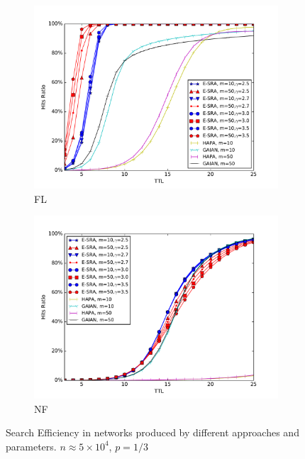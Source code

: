\begin{figure}[!t]
\centering

\begin{subfigure}{.45\textwidth} 
\centering
\includegraphics[width=.99\linewidth]{img/chap2/FL.pdf}
\caption{FL}\label{fig:removeFL}
\end{subfigure} 
\begin{subfigure}{.45\textwidth} 
\centering
\includegraphics[width=.99\linewidth]{img/chap2/NF.pdf}
\caption{NF}\label{fig:removeNF}
\end{subfigure} 

\caption{Search Efficiency in networks produced by different approaches and parameters. $n \approx 5 \times 10^4$, $ p=1/3$ }
\label{fig:fig_search}
\end{figure}

